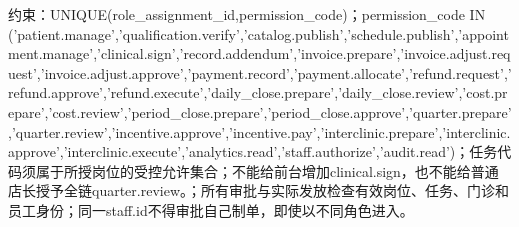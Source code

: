 \documentclass[UTF8,12pt,a4paper,fontset=none]{ctexart}
\begin{document}
约束：UNIQUE(\allowbreak{}role\_\allowbreak{}assignment\_\allowbreak{}id,\allowbreak{}permission\_\allowbreak{}code)\allowbreak{}；permission\_\allowbreak{}code IN (\allowbreak{}'patient.\allowbreak{}manage',\allowbreak{}'qualification.\allowbreak{}verify',\allowbreak{}'catalog.\allowbreak{}publish',\allowbreak{}'schedule.\allowbreak{}publish',\allowbreak{}'appointment.\allowbreak{}manage',\allowbreak{}'clinical.\allowbreak{}sign',\allowbreak{}'record.\allowbreak{}addendum',\allowbreak{}'invoice.\allowbreak{}prepare',\allowbreak{}'invoice.\allowbreak{}adjust.\allowbreak{}request',\allowbreak{}'invoice.\allowbreak{}adjust.\allowbreak{}approve',\allowbreak{}'payment.\allowbreak{}record',\allowbreak{}'payment.\allowbreak{}allocate',\allowbreak{}'refund.\allowbreak{}request',\allowbreak{}'refund.\allowbreak{}approve',\allowbreak{}'refund.\allowbreak{}execute',\allowbreak{}'daily\_\allowbreak{}close.\allowbreak{}prepare',\allowbreak{}'daily\_\allowbreak{}close.\allowbreak{}review',\allowbreak{}'cost.\allowbreak{}prepare',\allowbreak{}'cost.\allowbreak{}review',\allowbreak{}'period\_\allowbreak{}close.\allowbreak{}prepare',\allowbreak{}'period\_\allowbreak{}close.\allowbreak{}approve',\allowbreak{}'quarter.\allowbreak{}prepare',\allowbreak{}'quarter.\allowbreak{}review',\allowbreak{}'incentive.\allowbreak{}approve',\allowbreak{}'incentive.\allowbreak{}pay',\allowbreak{}'interclinic.\allowbreak{}prepare',\allowbreak{}'interclinic.\allowbreak{}approve',\allowbreak{}'interclinic.\allowbreak{}execute',\allowbreak{}'analytics.\allowbreak{}read',\allowbreak{}'staff.\allowbreak{}authorize',\allowbreak{}'audit.\allowbreak{}read')\allowbreak{}；任务代码须属于所授岗位的受控允许集合；不能给前台增加clinical.\allowbreak{}sign，也不能给普通店长授予全链quarter.\allowbreak{}review。；所有审批与实际发放检查有效岗位、任务、门诊和员工身份；同一staff.id不得审批自己制单，即使以不同角色进入。\par
\Needspace{621pt}
\end{document}
